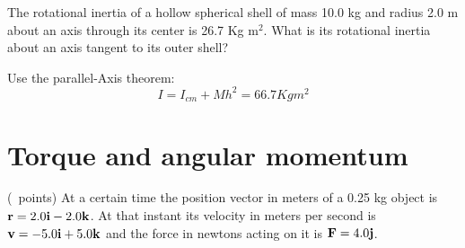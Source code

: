 \begin{questions}

\question[3] The rotational inertia of a hollow spherical shell of
mass 10.0 kg and radius 2.0 m about an axis through its center is 26.7
Kg m$^2$. What is its rotational inertia about an axis tangent to its
outer shell?
  \begin{solution}
    Use the parallel-Axis theorem:
    $$I = I_{cm} + Mh^2 = 66.7 Kg m^2$$
  \end{solution}



\section{Torque and angular momentum}

\question (\totalpoints\ points) At a certain time the position vector
in meters of a 0.25 kg object is ${\bf r} = 2.0 {\bf i} - 2.0 {\bf
  k}$. At that instant its velocity in meters per second is ${\bf v} =
-5.0{\bf i} + 5.0{\bf k}$ and the force in newtons acting on it is
${\bf F} = 4.0{\bf j}$.


\end{questions}
